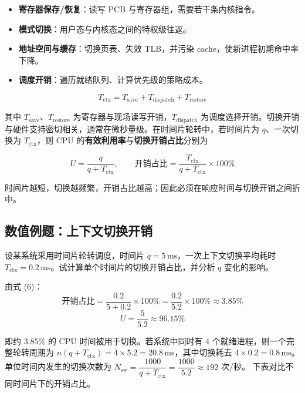 \begin{itemize}
    \item \textbf{寄存器保存/恢复}：读写 PCB 与寄存器组，需要若干条内核指令。
    \item \textbf{模式切换}：用户态与内核态之间的特权级往返。
    \item \textbf{地址空间与缓存}：切换页表、失效 TLB，并污染 cache，使新进程初期命中率下降。
    \item \textbf{调度开销}：遍历就绪队列、计算优先级的策略成本。
\end{itemize}

\begin{equation}
    T_{\text{ctx}} = T_{\text{save}} + T_{\text{dispatch}} + T_{\text{restore}}
\end{equation}

\noindent 其中 $T_{\text{save}}$、$T_{\text{restore}}$ 为寄存器与现场读写开销，$T_{\text{dispatch}}$ 为调度选择开销。切换开销与硬件支持密切相关，通常在微秒量级。在时间片轮转中，若时间片为 $q$、一次切换为 $T_{\text{ctx}}$，则 CPU 的\textbf{有效利用率}与\textbf{切换开销占比}分别为

\begin{equation}
    U = \frac{q}{q + T_{\text{ctx}}},
    \qquad
    \text{开销占比} = \frac{T_{\text{ctx}}}{q + T_{\text{ctx}}} \times 100\%
\end{equation}

\noindent 时间片越短，切换越频繁，开销占比越高；因此必须在响应时间与切换开销之间折中。

\subsection{数值例题：上下文切换开销}

\noindent 设某系统采用时间片轮转调度，时间片 $q = 5\,\text{ms}$，一次上下文切换平均耗时 $T_{\text{ctx}} = 0.2\,\text{ms}$。试计算单个时间片的切换开销占比，并分析 $q$ 变化的影响。

\medskip
\noindent 由式 (6)：
\[
    \text{开销占比} = \frac{0.2}{5 + 0.2} \times 100\% = \frac{0.2}{5.2} \times 100\% \approx 3.85\%
\]
\[
    U = \frac{5}{5.2} \approx 96.15\%
\]

\noindent 即约 $3.85\%$ 的 CPU 时间被用于切换。若系统中同时有 $4$ 个就绪进程，则一个完整轮转周期为
$n(q + T_{\text{ctx}}) = 4 \times 5.2 = 20.8\,\text{ms}$，其中切换耗去 $4 \times 0.2 = 0.8\,\text{ms}$。
单位时间内发生的切换次数为
$N_{\text{sw}} = \dfrac{1000}{q + T_{\text{ctx}}} = \dfrac{1000}{5.2} \approx 192$ 次/秒。
下表对比不同时间片下的开销占比。

